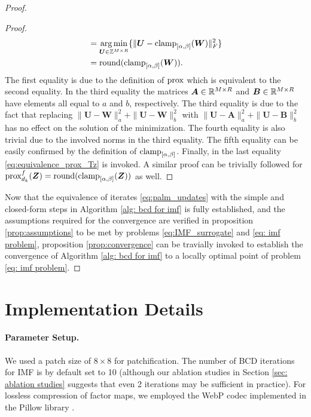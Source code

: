 \begin{proof}
\begin{proof}
\begin{align*}
            &= \operatorname*{arg\,min}_{\bm U \in \mathbb Z^{M\times R}}\{\|\bm U - \operatorname{clamp}_{[\alpha,\beta]}(\bm W)\|^2_F\}\\
            &= \operatorname{round}(\operatorname{clamp}_{[\alpha,\beta]}(\bm W)).
        \end{align*}
        The first equality is due to the definition of $\operatorname{prox}$ which is equivalent to the second equality. 
        In the third equality the matrices $\bm A\in\mathbb{R}^{M\times R}$ and $\bm B\in\mathbb{R}^{M\times R}$ have elements all equal to $a$ and $b$, respectively.
        The third equality is due to the fact that replacing $\|\bm U - \bm W\|^2_a + \|\bm U - \bm W\|^2_b$ with $\|\bm U - \bm A\|^2_a + \|\bm U - \bm B\|^2_b$ has no effect on the solution of the minimization. The fourth equality is also trivial due to the involved norms in the third equality. The fifth equality can be easily confirmed by the definition of $\operatorname{clamp}_{[\alpha,\beta]}$. Finally, in the last equality \eqref{eq:equivalence_prox_Tz} is invoked. A similar proof can be trivially followed for $\operatorname{prox}^f_{d_k}(\bm Z) = \operatorname{round}(\operatorname{clamp}_{[\alpha,\beta]}(\bm Z))$ as well.
    \end{proof}
    Now that the equivalence of iterates \eqref{eq:palm_updates} with the simple and closed-form steps in Algorithm \ref{alg: bcd for imf} is fully established, and the assumptions required for the convergence are verified in proposition \ref{prop:assumptions} to be met by problems \eqref{eq:IMF_surrogate} and \eqref{eq: imf problem}, proposition \ref{prop:convergence} can be travially invoked to establish the convergence of Algorithm \ref{alg: bcd for imf} to a locally optimal point of problem \eqref{eq: imf problem}.
\end{proof}

\section{Implementation Details} \label{sec: implementation details}

\paragraph{Parameter Setup.} We used a patch size of $8 \times 8$ for patchification. The number of BCD iterations for IMF is by default set to 10 (although our ablation studies in Section \ref{sec: ablation studies} suggests that even 2 iterations may be sufficient in practice). For lossless compression of factor maps, we employed the WebP codec implemented in the Pillow library \cite{clark2015pillow}. 

